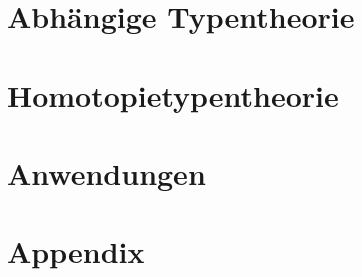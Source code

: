 \documentclass{../util/hott}
\begin{document}
\section{Abhängige Typentheorie}


\pagebreak
\section{Homotopietypentheorie}


\pagebreak
\section{Anwendungen}

\pagebreak
\appendix
\section{Appendix}


\printindex

\printbibliography
\end{document}
